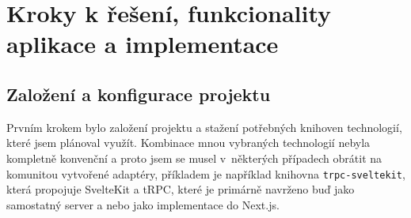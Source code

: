 \documentclass[12pt, a4paper,
openright
]{report}
\begin{document}

\chapter{Kroky k řešení, funkcionality aplikace a implementace}
\section{Založení a konfigurace projektu}
Prvním krokem bylo založení projektu a stažení potřebných knihoven technologií, které jsem plánoval využít. Kombinace mnou vybraných technologií nebyla kompletně konvenční a proto jsem se musel v~některých případech obrátit na komunitou vytvořené adaptéry, příkladem je například knihovna \texttt{trpc-sveltekit}, která propojuje SvelteKit a tRPC, které je primárně navrženo buď jako samostatný server a nebo jako implementace do Next.js.

\clearpage
\end{document}
